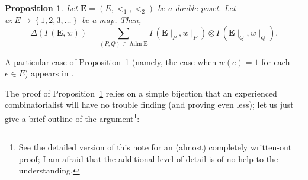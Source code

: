 \documentclass[12pt]{article}
\theoremstyle{plain}
\newtheorem{proposition}[theorem]{Proposition}
\theoremstyle{definition}
\theoremstyle{remark}
\let\sumnonlimits\sum
\renewcommand{\sum}{\sumnonlimits\limits}
\newcommand{\Adm}{\operatorname{Adm}}
\newcommand{\EE}{{\mathbf{E}}}
\begin{document}
\begin{proposition}
\label{prop.Gammaw.coprod}
Let $\EE = \left(E, <_1, <_2\right)$ be a double poset. Let
$w : E \to \left\{1, 2, 3, \ldots\right\}$ be a map.
Then,
\begin{equation}
\label{eq.prop.Gammaw.coprod}
\Delta\left(\Gamma\left(\EE, w\right)\right)
= \sum_{\left(P, Q\right) \in \Adm \EE}
\Gamma\left(\EE\mid_P, w\mid_P\right)
\otimes \Gamma\left(\EE\mid_Q, w\mid_Q\right) .
\end{equation}
\end{proposition}

A particular case of Proposition~\ref{prop.Gammaw.coprod} (namely,
the case when $w\left(e\right) = 1$ for each $e \in E$) appears in
\cite[Th\'eor\`eme 4.16]{Malve-Thesis}.


The proof of Proposition~\ref{prop.Gammaw.coprod} relies on
a simple bijection that an experienced combinatorialist will
have no trouble finding (and proving even less); let us just
give a brief outline of the argument\footnote{See the detailed
version of this note for an (almost) completely written-out
proof; I am afraid that the additional level of detail is of
no help to the understanding.}:
\end{document}
